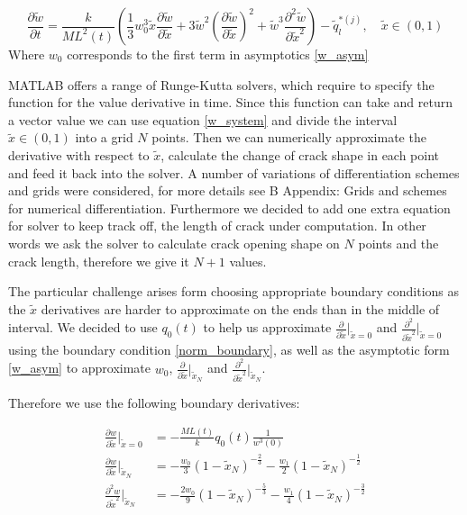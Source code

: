 \begin{equation}\label{w_system}
\frac{\partial \tilde w}{\partial t}=\frac{k}{ML^2(t)}\left(\frac{1}{3}w_0^3\tilde x\frac{\partial \tilde w}{\partial \tilde x}+3\tilde w^2\left(\frac{\partial \tilde w}{\partial  \tilde x}\right)^2+\tilde w^3\frac{\partial^2 \tilde w}{\partial \tilde x^2}\right)
-\tilde q_l^{*(j)}, \quad \tilde x\in(0,1)
\end{equation}
Where $w_0$ corresponds to the first term in asymptotics \eqref{w_asym}

MATLAB offers a range of Runge-Kutta solvers, which require to specify the function for the value derivative in time. Since this function can take and return a vector value we can use equation \eqref{w_system} and divide the interval $\tilde x \in (0 ,1)$ into a grid $N$ points. Then we can numerically approximate the derivative with respect to $\tilde x$, calculate the change of crack shape in each point and feed it back into the solver. A number of variations of differentiation schemes and grids were considered, for more details see {\color{blue} B Appendix: Grids and schemes for numerical differentiation}. Furthermore we decided to add one extra equation for solver to keep track off, the length of crack under computation. In other words we ask the solver to calculate crack opening shape on $N$ points and the crack length, therefore we give it $N+1$ values.

The particular challenge arises form choosing appropriate boundary conditions as the $\tilde x$ derivatives are harder to approximate on the ends than in the middle of interval. We decided to use $q_0(t)$ to help us approximate $\frac{\partial }{\partial \tilde x}|_{\tilde x=0}$ and $\frac{\partial^2 }{\partial \tilde x^2}|_{\tilde x=0}$ using the boundary condition \eqref{norm_boundary}, as well as the asymptotic form \eqref{w_asym} to approximate $w_0$, $\frac{\partial }{\partial \tilde x}|_{\tilde x_N}$ and $\frac{\partial^2 }{\partial \tilde x^2}|_{\tilde x_N}$.

Therefore we use the following boundary derivatives:
 
\begin{align}
\label{dwdx_left}
\frac{\partial w}{\partial \tilde x}|_{\tilde x=0}&=-\frac{ML(t)}{k}q_0(t)\frac{1}{w^3(0)}
\\
\label{dwdx_right_1}
\frac{\partial w}{\partial \tilde x}|_{\tilde x_N}&=-\frac{w_0}{3}(1-\tilde x_N)^{-\frac{2}{3}}-\frac{w_1}{2}(1-\tilde x_N)^{-\frac{1}{2}}
\\
\label{dwdx_right_2}
\frac{\partial^2 w}{\partial \tilde x^2}|_{\tilde x_N}&=-\frac{2w_0}{9}(1-\tilde x_N)^{-\frac{5}{3}}-\frac{w_1}{4}(1-\tilde x_N)^{-\frac{3}{2}}
\end{align}

